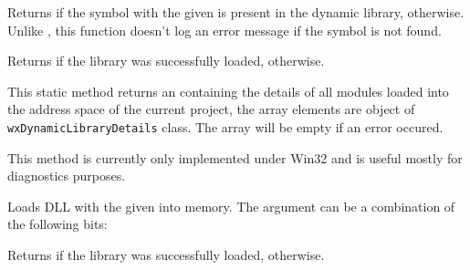 
Returns \true if the symbol with the given  is present in the dynamic
library, \false otherwise. Unlike ,
this function doesn't log an error message if the symbol is not found.



\label{wxdynamiclibraryisloaded}


Returns \true if the library was successfully loaded, \false otherwise.


\label{wxdynamiclibrarylistloaded}


This static method returns an  containing the details
of all modules loaded into the address space of the current project, the array
elements are object of \texttt{wxDynamicLibraryDetails} class. The array will
be empty if an error occured.

This method is currently only implemented under Win32 and is useful mostly for
diagnostics purposes.


\label{wxdynamiclibraryload}


Loads DLL with the given  into memory. The  argument can
be a combination of the following bits:

\begin{twocollist}
\end{twocollist}

Returns \true if the library was successfully loaded, \false otherwise.


\label{wxdynamiclibraryunload}


